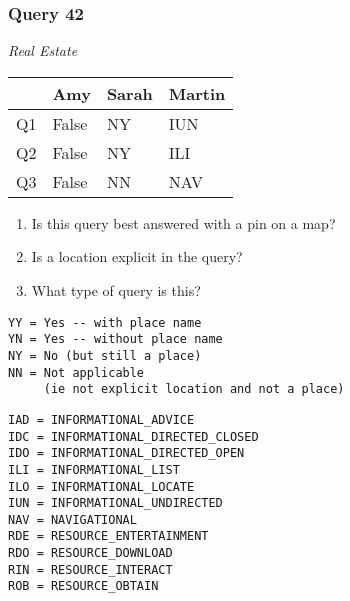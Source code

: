 \begin{frame}[fragile]
\frametitle{Query 42}
\vspace{1em}

\emph{Real Estate}

\vfill

\begin{table}
  \centering
  \begin{tabular}{ l l l l }
    & \textbf{Amy} & \textbf{Sarah} & \textbf{Martin}\\
    \toprule
    Q1 & False & NY & IUN\\
Q2 & False & NY & ILI\\
Q3 & False & NN & NAV\\
    \bottomrule
  \end{tabular}
\end{table}

\vfill

\tiny{

\begin{enumerate}
\item Is this query best answered with a pin on a map?
\item Is a location explicit in the query?
\item What type of query is this?
\end{enumerate}

\vfill

\begin{multicols}{2}
\begin{verbatim}
YY = Yes -- with place name
YN = Yes -- without place name
NY = No (but still a place)
NN = Not applicable 
     (ie not explicit location and not a place)
\end{verbatim}

\columnbreak
\begin{verbatim}
IAD = INFORMATIONAL_ADVICE
IDC = INFORMATIONAL_DIRECTED_CLOSED
IDO = INFORMATIONAL_DIRECTED_OPEN
ILI = INFORMATIONAL_LIST
ILO = INFORMATIONAL_LOCATE
IUN = INFORMATIONAL_UNDIRECTED
NAV = NAVIGATIONAL
RDE = RESOURCE_ENTERTAINMENT
RDO = RESOURCE_DOWNLOAD
RIN = RESOURCE_INTERACT
ROB = RESOURCE_OBTAIN
\end{verbatim}
\end{multicols}
}

\end{frame}



